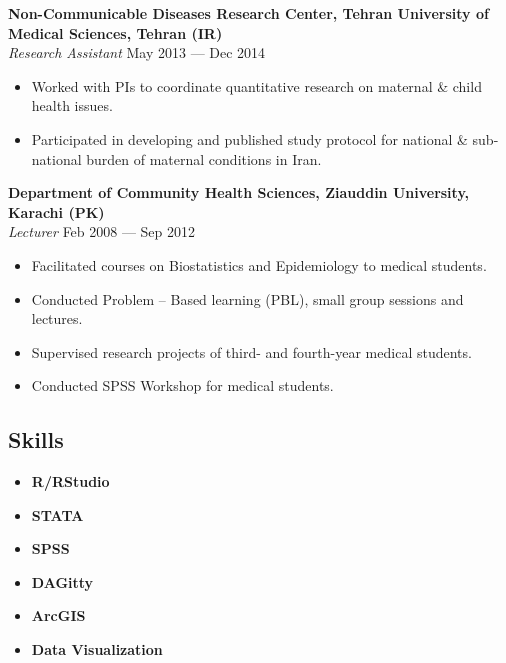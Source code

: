 \documentclass[
  letterpaper,
  DIV=11,
  numbers=noendperiod]{scrartcl}
\providecommand{\tightlist}{%
  \setlength{\itemsep}{0pt}\setlength{\parskip}{0pt}}\usepackage{longtable,booktabs,array}
\begin{document}
\textbf{{Non-Communicable Diseases Research Center, Tehran University of
Medical Sciences, Tehran (IR)}}\\
\emph{Research Assistant} {May 2013 --- Dec 2014}

\begin{itemize}
\item
  Worked with PIs to coordinate quantitative research on maternal \&
  child health issues.
\item
  Participated in developing and published study protocol for national
  \& sub-national burden of maternal conditions in Iran.
\end{itemize}

\textbf{{Department of Community Health Sciences, Ziauddin University,
Karachi (PK)}}\\
\emph{Lecturer} {Feb 2008 --- Sep 2012}

\begin{itemize}
\item
  Facilitated courses on Biostatistics and Epidemiology to medical
  students.
\item
  Conducted Problem -- Based learning (PBL), small group sessions and
  lectures.
\item
  Supervised research projects of third- and fourth-year medical
  students.
\item
  Conducted SPSS Workshop for medical students.
\end{itemize}

\subsection{Skills}\label{skills}

\begin{itemize}
\tightlist
\item
  \textbf{R/RStudio}
\item
  \textbf{STATA}
\item
  \textbf{SPSS}
\item
  \textbf{DAGitty}
\item
  \textbf{ArcGIS}
\item
  \textbf{Data Visualization}
\end{itemize}
\end{document}
